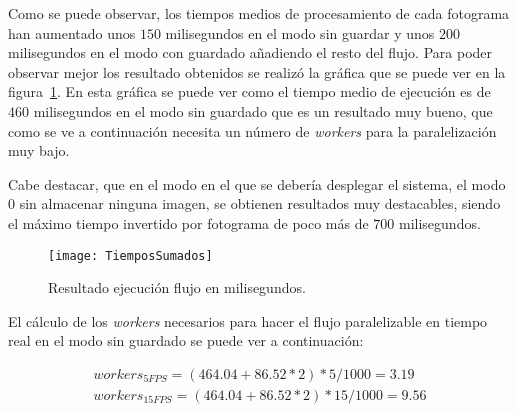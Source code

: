 {\begin{table}[h]
	\centering
	\caption{Tabla con los resultados de la ejecución del flujo en milisegundos.}
	\label{tab:res2}
\end{table}

Como se puede observar, los tiempos medios de procesamiento de cada fotograma han aumentado unos $150$ milisegundos en el modo sin guardar y unos $200$ milisegundos en el modo con guardado añadiendo el resto del flujo. Para poder observar mejor los resultado obtenidos se realizó la gráfica que se puede ver en la figura~\ref{fig:res2}. En esta gráfica se puede ver como el tiempo medio de ejecución es de $460$ milisegundos en el modo sin guardado que es un resultado muy bueno, que como se ve a continuación necesita un número de \textit{workers} para la paralelización muy bajo.

Cabe destacar, que en el modo en el que se debería desplegar el sistema, el modo 0 sin almacenar ninguna imagen, se obtienen resultados muy destacables, siendo el máximo tiempo invertido por fotograma de poco más de $700$ milisegundos.

\begin{figure}[h]
	\centering
	\texttt{[image: TiemposSumados]}
	\caption{Resultado ejecución flujo en milisegundos.}
	\label{fig:res2}
\end{figure}

El cálculo de los \textit{workers} necesarios para hacer el flujo paralelizable en tiempo real en el modo sin guardado se puede ver a continuación:

\begin{equation}
\begin{split}
workers_{5FPS} = (464.04 + 86.52*2)*5/1000 = 3.19\\
workers_{15FPS} = (464.04 + 86.52*2)*15/1000 = 9.56
\end{split}
\end{equation}

}
